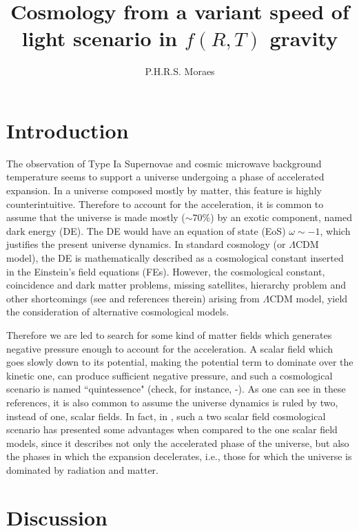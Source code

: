 \documentclass[aps,twocolumn,showpacs]{revtex4}
\begin{document}
\title{Cosmology from a variant speed of light scenario in $f(R,T)$ gravity}
\author{P.H.R.S. Moraes}

\begin{abstract}

\end{abstract}

\pacs{}

\maketitle

\section{Introduction}\label{sec:int}

The observation of Type Ia Supernovae \cite{riess/1998,perlmutter/1999} and cosmic microwave background temperature \cite{hinshaw/2013} seems to support a universe undergoing a phase of accelerated expansion. In a universe composed mostly by matter, this feature is highly counterintuitive. Therefore to account for the acceleration, it is common to assume that the universe is made mostly ($\sim70\%$) by an exotic component, named dark energy (DE). The DE would have an equation of state (EoS) $\omega\sim-1$, which justifies the present universe dynamics. In standard cosmology (or $\Lambda$CDM model), the DE is mathematically described as a cosmological constant inserted in the Einstein's field equations (FEs). However, the cosmological constant, coincidence and dark matter problems, missing satellites, hierarchy problem and other shortcomings (see \cite{clifton/2012} and references therein) arising from $\Lambda$CDM model, yield the consideration of alternative cosmological models.

Therefore we are led to search for some kind of matter fields which generates negative pressure enough to account for the acceleration. A scalar field which goes slowly down to its potential, making the potential term to dominate over the kinetic one, can produce sufficient negative pressure, and such a cosmological scenario is named ``quintessence" (check, for instance, \cite{cds}-\cite{ms/2014}). As one can see in these references, it is also common to assume the universe dynamics is ruled by two, instead of one, scalar fields. In fact, in \cite{ms/2014}, such a two scalar field cosmological scenario has presented some advantages when compared to the one scalar field models, since it describes not only the accelerated phase of the universe, but also the phases in which the expansion decelerates, i.e., those for which the universe is dominated by radiation and matter.


\section{Discussion}\label{sec:dis}


\pagebreak

\end{document}
